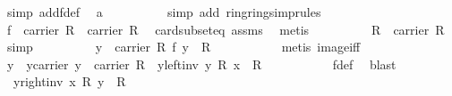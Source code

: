 \begin{isabellebody}
\ {\isacharparenleft}{\kern0pt}simp\ add{\isacharcolon}{\kern0pt}f{\isacharunderscore}{\kern0pt}def{\isacharparenright}{\kern0pt}\ \isamarkupfalse%
\ a\isanewline
\ \ \ \ \ \ \ \ \isamarkupfalse%
\ {\isacharparenleft}{\kern0pt}simp\ add{\isacharcolon}{\kern0pt}\ ring{\isachardot}{\kern0pt}ring{\isacharunderscore}{\kern0pt}simprules{\isacharparenleft}{\kern0pt}{}{\isacharparenright}{\kern0pt}{\isacharparenright}{\kern0pt}\isanewline
\ \ \ \ \ \ \isamarkupfalse%
\ \isamarkupfalse%
\ {\isachardoublequoteopen}f\ {\isacharbackquote}{\kern0pt}\ carrier\ R\ {\isacharequal}{\kern0pt}\ carrier\ R{\isachardoublequoteclose}\ \isamarkupfalse%
\ card{\isacharunderscore}{\kern0pt}subset{\isacharunderscore}{\kern0pt}eq\ assms{\isacharparenleft}{\kern0pt}{}{\isacharparenright}{\kern0pt}\ \isamarkupfalse%
\ metis\isanewline
\ \ \ \ \ \ \isamarkupfalse%
\ \isamarkupfalse%
\ {\isachardoublequoteopen}{\isasymone}\isactrlbsub R\isactrlesub \ {\isasymin}\ carrier\ R{\isachardoublequoteclose}\ \isamarkupfalse%
\ simp\isanewline
\ \ \ \ \ \ \isamarkupfalse%
\ \isamarkupfalse%
\ {\isachardoublequoteopen}{\isasymexists}y\ {\isasymin}\ carrier\ R{\isachardot}{\kern0pt}\ f\ y\ {\isacharequal}{\kern0pt}\ {\isasymone}\isactrlbsub R\isactrlesub {\isachardoublequoteclose}\ \isanewline
\ \ \ \ \ \ \ \ \isamarkupfalse%
\ {\isacharparenleft}{\kern0pt}metis\ image{\isacharunderscore}{\kern0pt}iff{\isacharparenright}{\kern0pt}\isanewline
\ \ \ \ \ \ \isamarkupfalse%
\ \isamarkupfalse%
\ y\ \ y{\isacharunderscore}{\kern0pt}carrier{\isacharcolon}{\kern0pt}\ {\isachardoublequoteopen}y\ {\isasymin}\ carrier\ R{\isachardoublequoteclose}\ \ y{\isacharunderscore}{\kern0pt}left{\isacharunderscore}{\kern0pt}inv{\isacharcolon}{\kern0pt}\ {\isachardoublequoteopen}y\ {\isasymotimes}\isactrlbsub R\isactrlesub \ x\ {\isacharequal}{\kern0pt}\ {\isasymone}\isactrlbsub R\isactrlesub {\isachardoublequoteclose}\ \isanewline
\ \ \ \ \ \ \ \ \isamarkupfalse%
\ f{\isacharunderscore}{\kern0pt}def\ \isamarkupfalse%
\ blast\isanewline
\ \ \ \ \ \ \isamarkupfalse%
\ \ y{\isacharunderscore}{\kern0pt}right{\isacharunderscore}{\kern0pt}inv{\isacharcolon}{\kern0pt}\ {\isachardoublequoteopen}x\ {\isasymotimes}\isactrlbsub R\isactrlesub \ y\ {\isacharequal}{\kern0pt}\ {\isasymone}\isactrlbsub R\isactrlesub {\isachardoublequoteclose}\ \isamarkupfalse%

\end{isabellebody}

